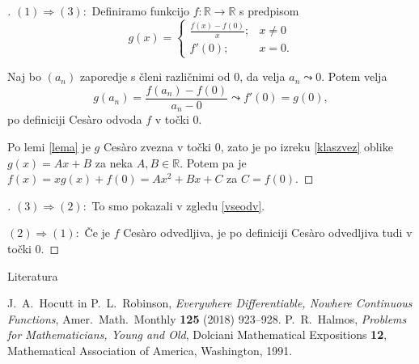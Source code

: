 \documentclass{beamer}
\newenvironment{dokaz}{\begin{proof}[\bfseries\upshape\proofname]}{\end{proof}}
\begin{document}
\begin{frame}
    \begin{dokaz}\renewcommand{\qedsymbol}{}
        $(1) \Rightarrow (3): $ Definiramo funkcijo $f: \mathbb{R} \rightarrow \mathbb{R}$ s predpisom 
        $$
        g(x) = \begin{cases}
            \frac{f(x)-f(0)}{x}; & x \neq 0\\
            f'(0); & x = 0.
        \end{cases}
        $$
        \pause

        Naj bo $(a_n)$ zaporedje s členi različnimi od $0$, da velja $a_n \leadsto 0$. Potem velja 
        $$g(a_n) = \frac{f(a_n)-f(0)}{a_n-0} \leadsto f'(0) = g(0),$$
        po definiciji Ces\`{a}ro odvoda $f$ v točki $0$. 
        \pause
        
        Po lemi \ref{lema} je $g$ Ces\`{a}ro zvezna v točki $0$, zato je po izreku \ref{klaszvez} oblike $g(x) = Ax + B$ za neka $A, B \in \mathbb{R}$. Potem pa je 
        $f(x) = xg(x) + f(0) = Ax^2 + Bx + C$ za $C = f(0)$.
    \end{dokaz}
\end{frame}

\begin{frame}
    \begin{dokaz}
        $(3) \Rightarrow (2): $ To smo pokazali v zgledu \ref{vseodv}.
        \pause

        \medskip
        $(2) \Rightarrow (1): $ Če je $f$ Ces\`{a}ro odvedljiva, je po definiciji Ces\`{a}ro odvedljiva tudi v točki $0$.
    \end{dokaz}
\end{frame}

\begin{frame}
    
\end{frame}

\begin{frame}{Literatura}
    \begin{thebibliography}{1}
        J.~A.~Hocutt in P.~L.~Robinson, \emph{Everywhere Differentiable, Nowhere Continuous Functions}, Amer.~Math.~Monthly \textbf{125} (2018) 923--928.
        P.~R.~Halmos, \emph{Problems for Mathematicians, Young and Old}, Dolciani Mathematical Expositions \textbf{12}, Mathematical Association of America, Washington, 1991.
    \end{thebibliography}
\end{frame}
\end{document}

